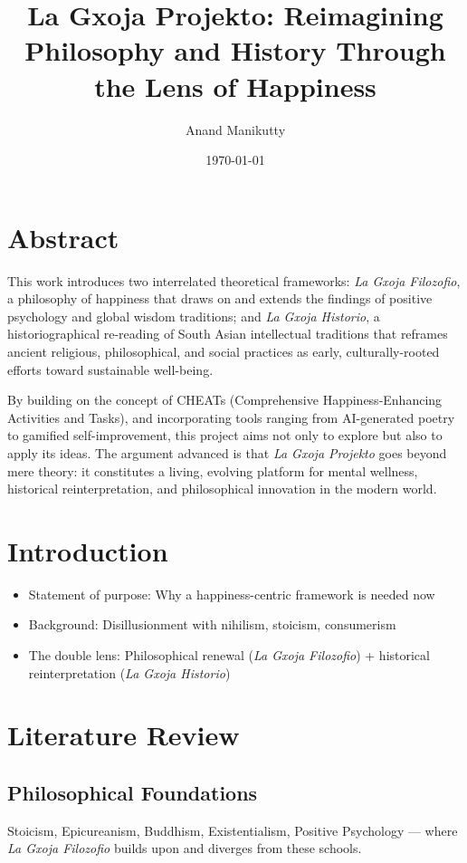 \documentclass[12pt]{article}
\title{\textbf{La Gxoja Projekto: Reimagining Philosophy and History Through the Lens of Happiness}}
\author{Anand Manikutty}
\date{\today}
\begin{document}
\maketitle

\section*{Abstract}
This work introduces two interrelated theoretical frameworks: \textit{La Gxoja Filozofio}, a philosophy of happiness that draws on and extends the findings of positive psychology and global wisdom traditions; and \textit{La Gxoja Historio}, a historiographical re-reading of South Asian intellectual traditions that reframes ancient religious, philosophical, and social practices as early, culturally-rooted efforts toward sustainable well-being.

By building on the concept of CHEATs (Comprehensive Happiness-Enhancing Activities and Tasks), and incorporating tools ranging from AI-generated poetry to gamified self-improvement, this project aims not only to explore but also to apply its ideas. The argument advanced is that \textit{La Gxoja Projekto} goes beyond mere theory: it constitutes a living, evolving platform for mental wellness, historical reinterpretation, and philosophical innovation in the modern world.

\section{Introduction}
\begin{itemize}[leftmargin=*, label=--]
  \item Statement of purpose: Why a happiness-centric framework is needed now
  \item Background: Disillusionment with nihilism, stoicism, consumerism
  \item The double lens: Philosophical renewal (\textit{La Gxoja Filozofio}) + historical reinterpretation (\textit{La Gxoja Historio})
\end{itemize}

\section{Literature Review}
\subsection{Philosophical Foundations}
Stoicism, Epicureanism, Buddhism, Existentialism, Positive Psychology — where \textit{La Gxoja Filozofio} builds upon and diverges from these schools.
\end{document}
